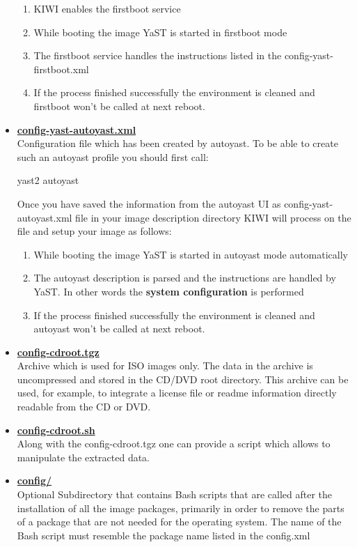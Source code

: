 \begin{itemize}
      \begin{enumerate}
      \item KIWI enables the firstboot service
      \item While booting the image YaST is started in firstboot mode
      \item The firstboot service handles the instructions listed in the
            config-yast-firstboot.xml
      \item If the process finished successfully the environment is
            cleaned and firstboot won't be called at next reboot.
      \end{enumerate} 

\item \textbf{\underline{config-yast-autoyast.xml}}\\
      Configuration file which has been created by autoyast.
      To be able to create such an autoyast profile you should first
      call:

      \begin{Command}{8cm}
      yast2 autoyast
      \end{Command}

      Once you have saved the information from the autoyast UI as
      config-yast-autoyast.xml file in your image description directory KIWI
      will process on the file and setup your image as follows:
      \begin{enumerate}
      \item While booting the image YaST is started in autoyast mode
            automatically
      \item The autoyast description is parsed and the instructions are
            handled by YaST. In other words the \textbf{system configuration}
            is performed
      \item If the process finished successfully the environment is
            cleaned and autoyast won't be called at next reboot.
      \end{enumerate}

\item \textbf{\underline{config-cdroot.tgz}}\\
      Archive which is used for ISO images only. The data in the archive is
      uncompressed and stored in the CD/DVD root directory. This
      archive can be used, for example, to integrate a license file or
      readme information directly readable from the CD or DVD.

\item \textbf{\underline{config-cdroot.sh}}\\
      Along with the config-cdroot.tgz one can provide a script which allows
      to manipulate the extracted data.

\item \textbf{\underline{config/}}\\
      Optional Subdirectory that contains Bash scripts that are called
      after the installation of all the image packages, primarily in order
      to remove the parts of a package that are not needed for the operating
      system. The name of the Bash script must resemble the package name
      listed in the config.xml
\end{itemize}

